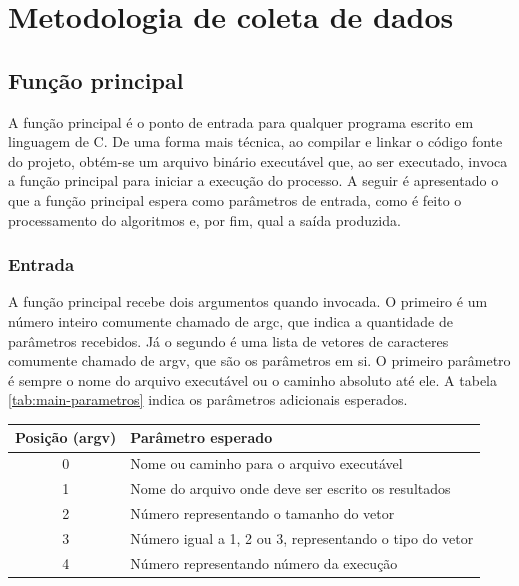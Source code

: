 \section{Metodologia de coleta de dados}
\subsection{Função principal}
A função principal é o ponto de entrada para qualquer programa escrito em linguagem de C. De uma forma mais técnica, ao compilar e linkar o código fonte do projeto, obtém-se um arquivo binário executável que, ao ser executado, invoca a função principal para iniciar a execução do processo. A seguir é apresentado o que a função principal espera como parâmetros de entrada, como é feito o processamento do algoritmos e, por fim, qual a saída produzida.

\subsubsection{Entrada}
A função principal recebe dois argumentos quando invocada. O primeiro é um número inteiro comumente chamado de argc, que indica a quantidade de parâmetros recebidos. Já o segundo é uma lista de vetores de caracteres comumente chamado de argv, que são os parâmetros em si. O primeiro parâmetro é sempre o nome do arquivo executável ou o caminho absoluto até ele. A tabela \ref{tab:main-parametros} indica os parâmetros adicionais esperados.
\begin{table}[H]
    \centering
    \begin{tabular}{ c | l }
        \hline
        Posição (argv) & Parâmetro esperado\\
        \hline
        0              & Nome ou caminho para o arquivo executável\\
        \hline
        1              & Nome do arquivo onde deve ser escrito os resultados\\
        \hline
        2              & Número representando o tamanho do vetor\\
        \hline
        3              & Número igual a 1, 2 ou 3, representando o tipo do vetor\\
        \hline
        4              & Número representando número da execução\\
        \hline
    \end{tabular}
\end{table}


